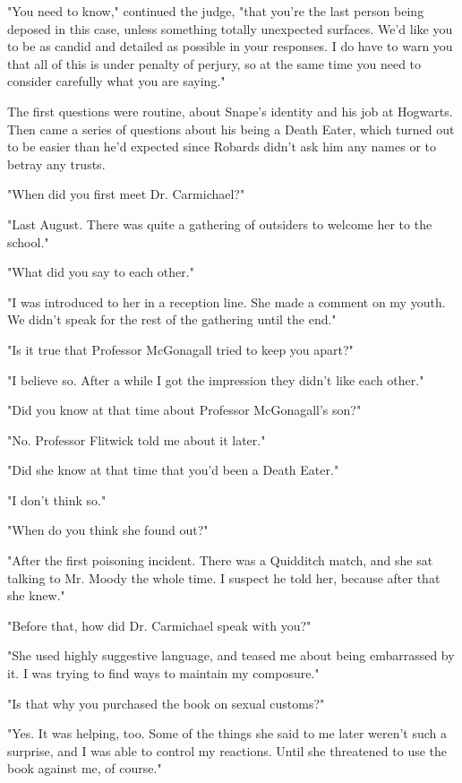 "You need to know," continued the judge, "that you're the last person being deposed in this case, unless something totally unexpected surfaces. We'd like you to be as candid and detailed as possible in your responses. I do have to warn you that all of this is under penalty of perjury, so at the same time you need to consider carefully what you are saying."

The first questions were routine, about Snape's identity and his job at Hogwarts. Then came a series of questions about his being a Death Eater, which turned out to be easier than he'd expected since Robards didn't ask him any names or to betray any trusts.

"When did you first meet Dr. Carmichael?"

"Last August. There was quite a gathering of outsiders to welcome her to the school."

"What did you say to each other."

"I was introduced to her in a reception line. She made a comment on my youth. We didn't speak for the rest of the gathering until the end."

"Is it true that Professor McGonagall tried to keep you apart?"

"I believe so. After a while I got the impression they didn't like each other."

"Did you know at that time about Professor McGonagall's son?"

"No. Professor Flitwick told me about it later."

"Did she know at that time that you'd been a Death Eater."

"I don't think so."

"When do you think she found out?"

"After the first poisoning incident. There was a Quidditch match, and she sat talking to Mr. Moody the whole time. I suspect he told her, because after that she knew."

"Before that, how did Dr. Carmichael speak with you?"

"She used highly suggestive language, and teased me about being embarrassed by it. I was trying to find ways to maintain my composure."

"Is that why you purchased the book on sexual customs?"

"Yes. It was helping, too. Some of the things she said to me later weren't such a surprise, and I was able to control my reactions. Until she threatened to use the book against me, of course."

